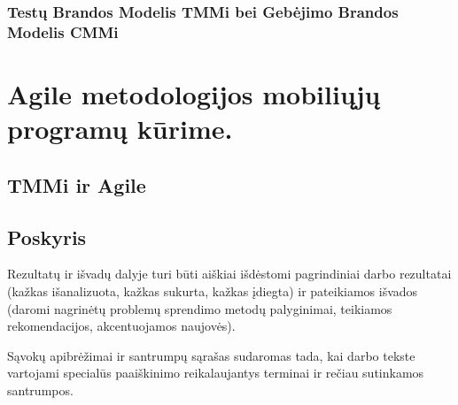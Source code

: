 \documentclass{VUMIFPSkursinis}
\begin{document}





\subsubsection{Testų Brandos Modelis TMMi bei Gebėjimo Brandos Modelis CMMi}


\section{Agile metodologijos mobiliųjų programų kūrime.}
\subsection{TMMi ir Agile}
\subsection{Poskyris}

Rezultatų ir išvadų dalyje turi būti aiškiai išdėstomi pagrindiniai darbo
rezultatai (kažkas išanalizuota, kažkas sukurta, kažkas įdiegta) ir pateikiamos
išvados (daromi nagrinėtų problemų sprendimo metodų palyginimai, teikiamos
rekomendacijos, akcentuojamos naujovės).

\printbibliography[heading=bibintoc]  %

Sąvokų apibrėžimai ir santrumpų sąrašas sudaromas tada, kai darbo tekste
vartojami specialūs paaiškinimo reikalaujantys terminai ir rečiau sutinkamos
santrumpos.

\appendix  %
\end{document}
